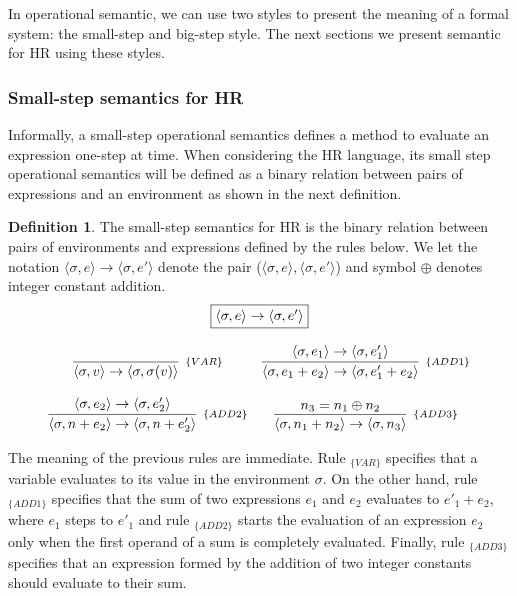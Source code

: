 \documentclass[oneside,12pt]{scrbook}
\theoremstyle{definition}
\theoremstyle{plain}
\theoremstyle{definition}
\newtheorem{Definition}{Definition}
\begin{document}
In operational semantic, we can use two styles to present the meaning of a formal system: the small-step and
big-step style. The next sections we present semantic for HR using these styles.

\subsubsection{Small-step semantics for HR}\label{subsubsection:small-step}

Informally, a small-step operational semantics defines a method to evaluate an expression one-step at time. When considering the HR language, its small step operational semantics will be defined as
a binary relation between pairs of expressions and an environment as shown in the next definition.

\begin{Definition}
	The small-step semantics for HR is the binary relation between pairs of environments and
	expressions defined by the rules below. We let the notation
	$\langle \sigma, e \rangle \to \langle \sigma, e' \rangle$ denote the pair
	($\langle \sigma, e \rangle , \langle \sigma, e' \rangle$) and symbol $\oplus$ denotes
	integer constant addition.
	\[
	\begin{array}{c}
	\fbox{$\langle \sigma, e \rangle \to \langle \sigma, e' \rangle$} \\  \\
	\begin{array}{cc}
	\infer[_{\{VAR\}}]
	{\langle \sigma, v \rangle \to \langle \sigma, \sigma(v)\rangle}{} &
	\infer[_{\{ADD1\}}]
	{\langle \sigma, e_1 + e_2\rangle \to \langle \sigma, e'_1 + e_2 \rangle}
	{\langle \sigma, e_1\rangle \to \langle \sigma, e'_1\rangle} \\ \\
	\infer[_{\{ADD2\}}]
	{\langle \sigma, n + e_2 \rangle \to \langle \sigma , n + e'_2\rangle}
	{\langle \sigma, e_2 \rangle \to \langle \sigma, e'_2 \rangle} &
	\infer[_{\{ADD3\}}]
	{\langle \sigma, n_1 + n_2 \rangle \to \langle \sigma, n_3 \rangle}
	{n_3 = n_1 \oplus n_2}
	\end{array}
	\end{array}
	\]
\end{Definition}

The meaning of the previous rules are immediate. Rule $_{\{VAR\}}$ specifies that a variable evaluates
to its value in the environment $\sigma$. On the other hand, rule $_{\{ADD1\}}$ specifies that the sum
of two expressions $e_1$ and $e_2$ evaluates to $e'_1 + e_2$, where $e_1$ steps to $e'_1$ and rule
$_{\{ADD2\}}$ starts the evaluation of an expression $e_2$ only when the first operand of a sum is
completely evaluated. Finally, rule $_{\{ADD3\}}$ specifies that an expression formed by the addition of two
integer constants should evaluate to their sum. 
\end{document}
